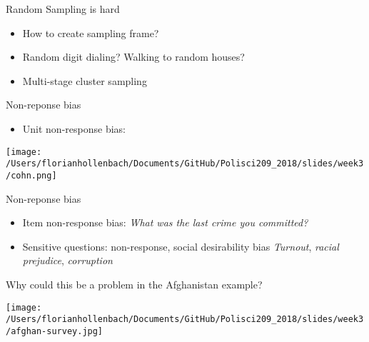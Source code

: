 \documentclass[presentation]{beamer}
\begin{document}
\begin{frame}[label={sec:orgb740948}]{Random Sampling is hard}
\begin{itemize}
\item How to create sampling frame?

\item Random digit dialing? Walking to random houses?

\item Multi-stage cluster sampling
\end{itemize}
\end{frame}

\begin{frame}[label={sec:org14f39ff}]{Non-reponse bias}
\begin{itemize}
\item Unit non-response bias:
\end{itemize}

\begin{center}
\texttt{[image: /Users/florianhollenbach/Documents/GitHub/Polisci209\_2018/slides/week3/cohn.png]}
\end{center}
\end{frame}




\begin{frame}[label={sec:org40a7991}]{Non-reponse bias}
\begin{itemize}
\item Item non-response bias:
\emph{What was the last crime you committed?}
\item Sensitive questions: non-response, social desirability bias
\emph{Turnout}, \emph{racial prejudice}, \emph{corruption}
\end{itemize}
\end{frame}


\begin{frame}[label={sec:org8c49026}]{Why could this be a problem in the Afghanistan example?}
\begin{center}
\texttt{[image: /Users/florianhollenbach/Documents/GitHub/Polisci209\_2018/slides/week3/afghan-survey.jpg]}
\end{center}
\end{frame}
\end{document}
